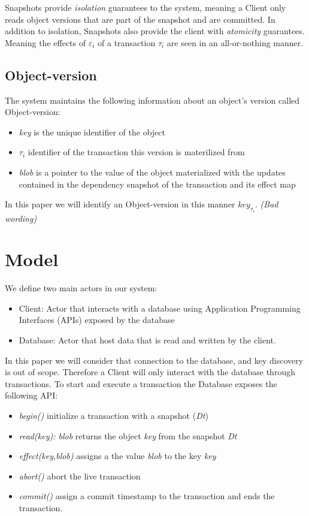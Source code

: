 \documentclass[systeme]{compas2022}
\begin{document}
Snapshots provide \emph{isolation} guarantees to the system, meaning a Client only reads object versions that are part of the snapshot and are committed. 
In addition to isolation, Snapshots also provide the client with \emph{atomicity} guarantees.
Meaning the effects of $\varepsilon_i$ of a transaction $\tau_i$ are seen in an all-or-nothing manner.

\subsection{Object-version}

The system maintains the following information about an object's version called Object-version: 
\begin{itemize}
  \item \emph{key} is the unique identifier of the object
  \item \emph{$\tau_i$} identifier of the transaction this version is materilized from
  \item \emph{blob} is a pointer to the value of the object materialized with the updates contained in the dependency snapshot of the transaction and its effect map
\end{itemize}

In this paper we will identify an Object-version in this manner $key_{\tau_i}$. \emph{(Bad wording)}

\section{Model}


We define two main actors in our system:
\begin{itemize}
  \item Client: Actor that interacts with a database using Application Programming Interfaces (APIs) exposed by the database
  \item Database: Actor that host data that is read and written by the client.
\end{itemize}


In this paper we will consider that connection to the database, and key discovery is out of scope.
Therefore a Client will only interact with the database through transactions.
To start and execute a transaction the Database exposes the following API:
\begin{itemize}
\item \emph{begin()} initialize a transaction with a snapshot (\emph{Dt})
\item \emph{read(key): blob} returns the object \emph{key} from the snapshot \emph{Dt}
\item \emph{effect(key,blob)} assigns a the value \emph{blob} to the key \emph{key}
\item \emph{abort()} abort the live transaction
\item \emph{commit()} assign a commit timestamp to the transaction and ends the transaction.
\end{itemize}
\end{document}
